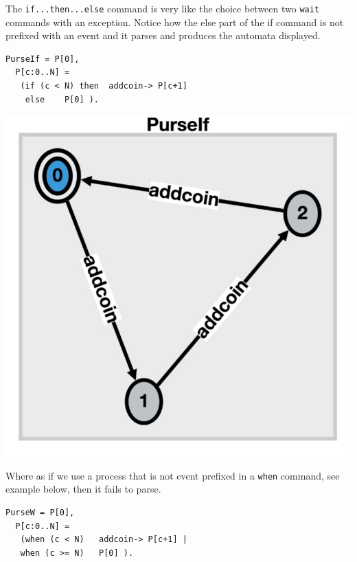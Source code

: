 \documentclass[]{article}
\begin{document}
{\color{red}
The \verb|if...then...else| command is very like the choice between two \verb|wait| commands with an exception.  Notice how the else part of the if command is not prefixed with an event and it parses and produces the automata displayed.

\begin{center}\begin{minipage}{0.5\textwidth}
\begin{verbatim}
PurseIf = P[0],
  P[c:0..N] =
   (if (c < N) then  addcoin-> P[c+1]
    else    P[0] ).\end{verbatim}
\end{minipage}
\begin{minipage}{0.45\textwidth}
\includegraphics[scale=0.15]{PurseIf.jpg}
\end{minipage}\end{center}

Where as if we use a process that is not event prefixed in a \verb|when| command, see example below, then it fails to parse.
\begin{center}\begin{minipage}{0.5\textwidth}
\begin{verbatim}
PurseW = P[0],
  P[c:0..N] =
   (when (c < N)   addcoin-> P[c+1] |
   when (c >= N)   P[0] ).\end{verbatim}
\end{minipage}\end{center}
}
\end{document}
